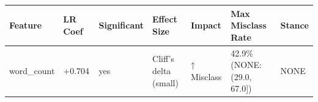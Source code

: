 \begin{tabular}{lllllll}
\toprule
Feature & LR Coef & Significant & Effect Size & Impact & Max Misclass Rate & Stance \\
\midrule
word\_count & +0.704 & yes & Cliff's delta (small) & ↑ Misclass & 42.9\% (NONE: (29.0, 67.0]) & NONE \\
\bottomrule
\end{tabular}
